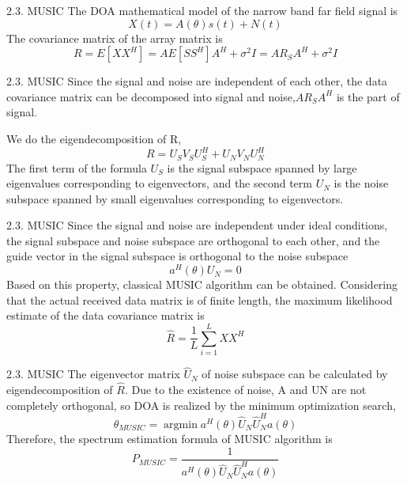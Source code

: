 \documentclass[12pt]{beamer}
\begin{document}
\begin{frame}{2.3. MUSIC}
  The DOA mathematical model of the narrow band far field signal is
  \begin{equation}
    X(t)=A(\theta)s(t)+N(t)
  \end{equation}
  The covariance matrix of the array matrix is
  \begin{equation}
    R=E\left[X X^{H}\right]=A E\left[S S^{H}\right] A^{H}+\sigma^{2} I=A R_{S} A^{H}+\sigma^{2} I
  \end{equation}
\end{frame}
\begin{frame}{2.3. MUSIC}
  Since the signal and noise are independent of each other, the data covariance matrix can be decomposed into signal and noise,$AR_SA^H$ is the part of signal.

  We do the eigendecomposition of R,\begin{equation}
    R=U_SV_SU_S^H+U_NV_NU_N^H
  \end{equation}
  The first term of the formula {\color{magenta} $U_S$ is the signal subspace }spanned by large eigenvalues corresponding to eigenvectors, and the second term {\color{magenta} $U_N$ is the noise subspace} spanned by small eigenvalues corresponding to eigenvectors.
\end{frame}
\begin{frame}{2.3. MUSIC}
  Since the signal and noise are independent under ideal conditions, the signal subspace and noise subspace are orthogonal to each other, and the guide vector in the signal subspace is orthogonal to the noise subspace
  \begin{equation}
    a^H(\theta)U_N=0
  \end{equation}\pause
  Based on this property, classical MUSIC algorithm can be obtained. Considering that the actual received data matrix is of finite length, the maximum likelihood estimate of the data covariance matrix is\begin{equation}
    \hat{R}=\frac{1}{L} \sum_{i=1}^{L} X X^{H}
  \end{equation}
\end{frame}
\begin{frame}{2.3. MUSIC}
  The eigenvector matrix $\hat{U}_N$ of noise subspace can be calculated by eigendecomposition of $\hat{R}$. Due to the existence of noise, A and UN are not completely orthogonal, so DOA is realized by the minimum optimization search,\begin{equation}
    \theta_{M U S I C}=\operatorname{argmin}a^{H}(\theta) \hat{U}_{N} \hat{U}_{N}^{H} a(\theta)
  \end{equation}\pause
  Therefore, the spectrum estimation formula of MUSIC algorithm is\begin{equation}
    P_{ {MUSIC }}=\frac{1}{a^{H}(\theta) \hat{U}_{N} \hat{U}_{N}^{H} a(\theta)}
  \end{equation}
  
\end{frame}
\end{document}
